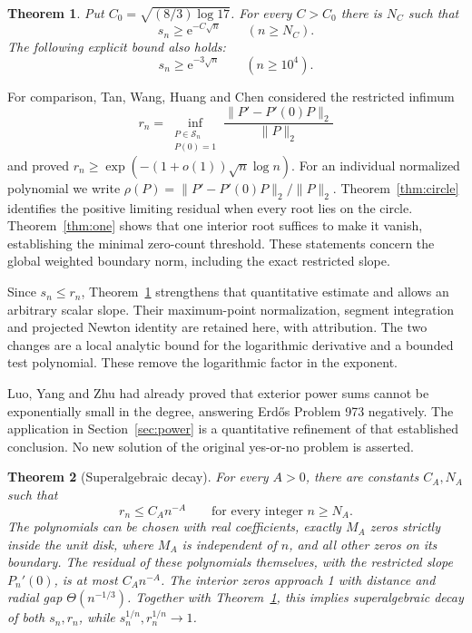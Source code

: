 \documentclass[11pt]{article}
\newtheorem{theorem}{Theorem}
\theoremstyle{remark}\newtheorem{remark}[theorem]{Remark}
\newcommand{\norm}[1]{\lVert #1\rVert}
\newcommand{\ee}{\mathrm e}
\begin{document}
\begin{theorem}\label{thm:main}
Put \(C_0=\sqrt{(8/3)\log17}\). For every \(C>C_0\) there is \(N_C\)
such that
\begin{equation}\label{eq:asymptotic}
 s_n\ge \ee^{-C\sqrt n}\qquad(n\ge N_C).
\end{equation}
The following explicit bound also holds:
\begin{equation}\label{eq:explicit}
 s_n\ge \ee^{-3\sqrt n}\qquad(n\ge10^4).
\end{equation}
\end{theorem}

For comparison, Tan, Wang, Huang and Chen \cite[Theorem 1.1]{tan}
considered the restricted infimum
\[
 r_n=\inf_{\substack{P\in\mathcal S_n\\P(0)=1}}
       \frac{\norm{P'-P'(0)P}_2}{\norm P_2}
\]
and proved \(r_n\ge\exp(-(1+o(1))\sqrt n\log n)\).
For an individual normalized polynomial we write
\(\rho(P)=\norm{P'-P'(0)P}_2/\norm P_2\).
Theorem~\ref{thm:circle} identifies the positive limiting residual
when every root lies on the circle. Theorem~\ref{thm:one} shows
that one interior root suffices to make it vanish, establishing the
minimal zero-count threshold. These statements
concern the global weighted boundary norm, including the exact
restricted slope.

Since \(s_n\le r_n\), Theorem~\ref{thm:main} strengthens that quantitative
estimate and allows an arbitrary scalar slope.
Their maximum-point normalization, segment integration and projected
Newton identity are retained here, with attribution. The two changes
are a local analytic bound for the logarithmic derivative and a bounded
test polynomial. These remove the logarithmic factor in the exponent.

Luo, Yang and Zhu \cite[Theorem 1.1]{luo} had already proved that exterior
power sums cannot be exponentially small in the degree, answering
Erd\H{o}s Problem 973 negatively. The application in Section~\ref{sec:power}
is a quantitative refinement of that established conclusion.
No new solution of the original yes-or-no problem is asserted.

\begin{theorem}[Superalgebraic decay]\label{thm:upper}
For every \(A>0\), there are constants \(C_A,N_A\) such that
\[
 r_n\le C_A n^{-A}\qquad\text{for every integer }n\ge N_A.
\]
The polynomials can be chosen with real coefficients, exactly
\(M_A\) zeros strictly inside the unit disk, where \(M_A\) is
independent of \(n\), and all other zeros on its boundary.
The residual of these polynomials themselves, with the restricted slope
\(P_n'(0)\), is at most \(C_An^{-A}\).
The interior zeros approach 1 with distance and radial gap
\(\Theta(n^{-1/3})\). Together with
Theorem~\ref{thm:main}, this implies superalgebraic decay of both
\(s_n,r_n\), while \(s_n^{1/n},r_n^{1/n}\to1\).
\end{theorem}
\end{document}
